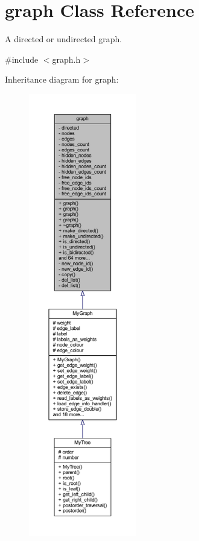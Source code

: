 \hypertarget{classgraph}{}\section{graph Class Reference}
\label{classgraph}


A directed or undirected graph.  




{\ttfamily \#include $<$graph.\+h$>$}



Inheritance diagram for graph\+:\nopagebreak
\begin{figure}[H]
\begin{center}
\leavevmode
\includegraphics[height=550pt]{classgraph__inherit__graph}
\end{center}
\end{figure}


